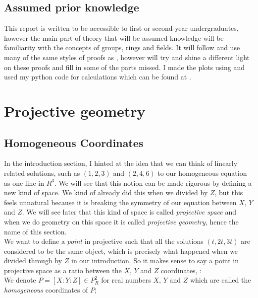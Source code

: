 \documentclass{article}
\begin{document}
\subsection{Assumed prior knowledge}

This report is written to be accessible to first or second-year undergraduates, however the main part of theory that will be assumed knowledge will be familiarity with the concepts of groups, rings and fields. It will follow and use many of the same styles of proofs as \cite{silverman}, however will try and shine a different light on these proofs and fill in some of the parts missed. I made the plots using \cite{desmos} and used my python code for calculations which can be found at \cite{github}.


\newpage

\section{Projective geometry}

\subsection{Homogeneous Coordinates}

In the introduction section, I hinted at the idea that we can think of linearly related solutions, such as $(1, 2, 3)$ and $(2, 4, 6)$ to our homogeneous equation  as one line in $R^3$. We will see that this notion can be made rigorous by defining a new kind of space. We kind of already did this when we divided by $Z$, but this feels unnatural because it is breaking the symmetry of our equation between $X$, $Y$ and $Z$. We will see later that this kind of space is called \emph{projective space} and when we do geometry on this space it is called \emph{projective geometry}, hence the name of this section.\\

We want to define a \emph{point} in projective such that all the solutions $(t, 2t, 3t)$ are considered to be the same object, which is precisely what happened when we divided through by $Z$ in our introduction. So it makes sense to say a point in projective space as a ratio between the $X$, $Y$ and $Z$ coordinates, :\\

We denote $P = [X : Y : Z] \in P_R^2$ for real numbers $X$, $Y$ and $Z$ which are called the \emph{homogeneous} coordinates of $P$;\\
\end{document}
